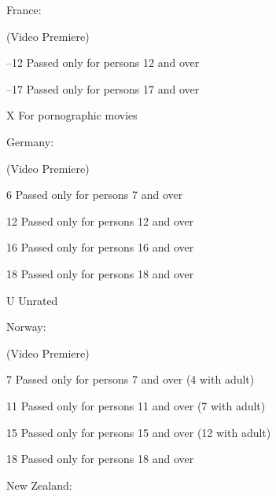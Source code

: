 \vspace{4mm}

France:
\nopagebreak

\vspace{2mm}
\begin{Ventry}{(Video Premiere)}
\item[--12]     Passed only for persons 12 and over
\item[--17]     Passed only for persons 17 and over
\item[X]      For pornographic movies
\end{Ventry}

\vspace{4mm}

Germany:
\nopagebreak

\vspace{2mm}
\begin{Ventry}{(Video Premiere)}
\item[6]      Passed only for persons 7 and over
\item[12]     Passed only for persons 12 and over
\item[16]     Passed only for persons 16 and over
\item[18]    Passed only for persons 18 and over
\item[U]      Unrated
\end{Ventry}

\vspace{4mm}

Norway:
\nopagebreak

\vspace{2mm}
\begin{Ventry}{(Video Premiere)}
\item[7]      Passed only for persons 7 and over (4 with adult)
\item[11]     Passed only for persons 11 and over (7 with adult)
\item[15]     Passed only for persons 15 and over (12 with adult)
\item[18]     Passed only for persons 18 and over
\end{Ventry}
            
\vspace{4mm}

New Zealand:
\nopagebreak


